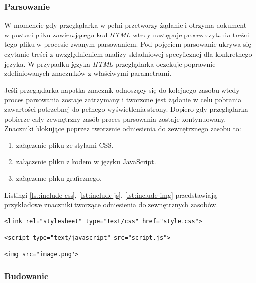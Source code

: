 \documentclass[polish, twoside, 12pt]{mwart}
\begin{document}
\subsubsection{Parsowanie}

W momencie gdy przeglądarka w pełni przetworzy żądanie i otrzyma dokument w postaci pliku zawierającego kod \emph{HTML} wtedy następuje proces czytania treści tego pliku w procesie zwanym parsowaniem. Pod pojęciem parsowanie ukrywa się czytanie treści z uwzględnieniem analizy składniowej specyficznej dla konkretnego języka. W przypadku języka \emph{HTML} przeglądarka oczekuje poprawnie zdefiniowanych znaczników z właściwymi parametrami. 

Jeśli przeglądarka napotka znacznik odnoszący się do kolejnego zasobu wtedy proces parsowania zostaje zatrzymany i tworzone jest żądanie  w celu pobrania zawartości potrzebnej do pełnego wyświetlenia strony. Dopiero gdy przeglądarka pobierze cały zewnętrzny zasób proces parsowania zostaje kontynuowany. Znaczniki blokujące poprzez tworzenie odniesienia do zewnętrznego zasobu to:

\begin{enumerate}
  \item załączenie pliku ze stylami CSS.
  \item załączenie pliku z kodem w języku JavaScript.
  \item załączenie pliku graficznego.
\end{enumerate}

Listingi \ref{lst:include-css}, \ref{lst:include-js}, \ref{lst:include-img} przedstawiają przykładowe znaczniki tworzące odniesienia do zewnętrznych zasobów.

\begin{lstlisting}[caption=Przykładowe załączenie pliku ze stylami \emph{css}, label={lst:include-css}]
<link rel="stylesheet" type="text/css" href="style.css">
\end{lstlisting}

\begin{lstlisting}[caption=Przykładowe załączenie pliku z kodem w języku \emph{JavaScript}, label={lst:include-js}]
<script type="text/javascript" src="script.js">
\end{lstlisting}

\begin{lstlisting}[caption=Przykładowe załączenie pliku graficznego, label={lst:include-img}]
<img src="image.png">
\end{lstlisting}

\subsubsection{Budowanie}
\end{document}
